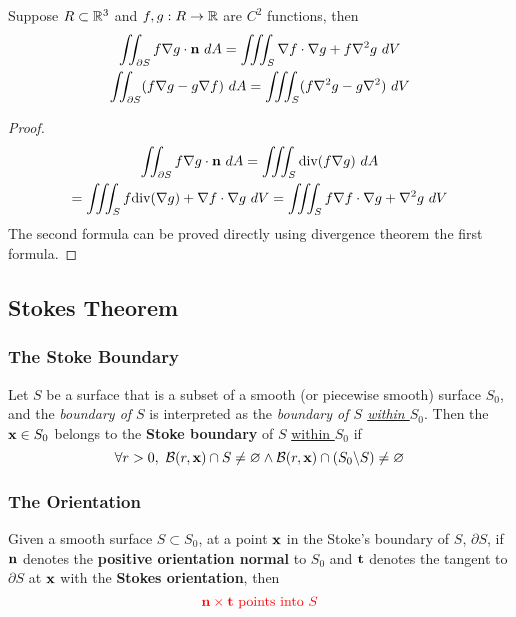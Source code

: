\documentclass[11pt]{article}
\begin{document}
			\begin{corollary}
				Suppose $R \subset \mathbb{R}^3$ and $f, g: R \to \mathbb{R}$ are $C^2$ functions, then 
				\begin{gather}
					\iint_{\partial S} f \nabla g \cdot \textbf{n}\ dA = \iiint_S \nabla f \cdot \nabla g + f \nabla^2 g\ dV \\
					\iint_{\partial S} (f \nabla g - g \nabla f)\ dA = \iiint_S (f \nabla^2 g - g \nabla^2)\ dV
				\end{gather}
				\begin{proof}
					\begin{gather}
						\iint_{\partial S} f \nabla g \cdot \textbf{n}\ dA = \iiint_S \text{div}(f \nabla g)\ dA \\
						= \iiint_S f \text{div} (\nabla g) + \nabla f \cdot \nabla g\ dV 
						= \iiint_S f \nabla f \cdot \nabla g + \nabla^2 g\ dV
					\end{gather}
					The second formula can be proved directly using divergence theorem the first formula.
				\end{proof}
			\end{corollary}
			
		\subsection{Stokes Theorem}
		\subsubsection{The Stoke Boundary}
			\begin{definition}
				Let $S$ be a surface that is a subset of a smooth (or piecewise smooth) surface $S_0$, and the \emph{boundary of $S$} is interpreted as the \emph{boundary of $S$ \ul{within $S_0$}}. Then the $\textbf{x} \in S_0$ belongs to the \textbf{Stoke boundary} of $S$ \ul{within $S_0$} if
				\begin{equation}
					\forall r > 0,\ \mathcal{{B}}(r, \textbf{x}) \cap S \neq \varnothing \land \mathcal{{B}}(r, \textbf{x}) \cap (S_0 \backslash S) \neq \varnothing
				\end{equation}
			\end{definition}
		
		\subsubsection{The Orientation}
			\begin{definition}
				Given a smooth surface $S \subset S_0$, at a point $\textbf{x}$ in the Stoke's boundary of $S$, $\partial S$, if $\textbf{n}$ denotes the \textbf{positive orientation normal} to $S_0$ and $\textbf{t}$ denotes the tangent to $\partial S$ at $\textbf{x}$ with the \textbf{Stokes orientation}, then
				\begin{equation}
					\textcolor{red}{\textbf{n} \times \textbf{t} \text{{ points into }}S}
				\end{equation}
			\end{definition}
		
\end{document}
